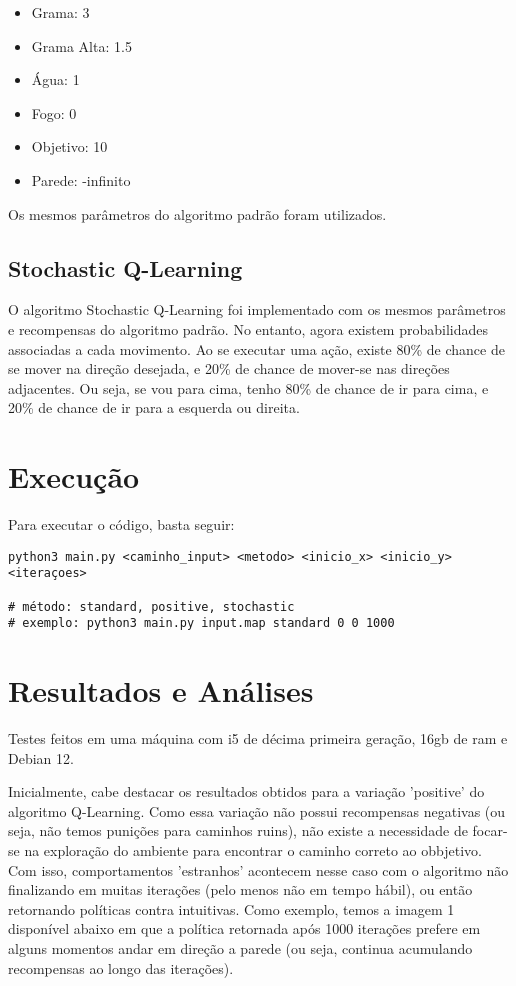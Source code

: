 \documentclass[10pt]{extarticle} %
\begin{document}
\begin{itemize}
    \item Grama: 3
    \item Grama Alta: 1.5
    \item Água: 1
    \item Fogo: 0
    \item Objetivo: 10
    \item Parede: -infinito
\end{itemize}

Os mesmos parâmetros do algoritmo padrão foram utilizados.

\subsection{Stochastic Q-Learning}

O algoritmo Stochastic Q-Learning foi implementado com os mesmos parâmetros e recompensas do algoritmo padrão. No entanto, agora existem probabilidades associadas a cada movimento. Ao se executar uma ação, existe 80\% de chance de se mover na direção desejada, e 20\% de chance de mover-se nas direções adjacentes. Ou seja, se vou para cima, tenho 80\% de chance de ir para cima, e 20\% de chance de ir para a esquerda ou direita.

\section{Execução}

Para executar o código, basta seguir:

\begin{verbatim}
python3 main.py <caminho_input> <metodo> <inicio_x> <inicio_y> <iteraçoes>

# método: standard, positive, stochastic
# exemplo: python3 main.py input.map standard 0 0 1000
\end{verbatim}

\section{Resultados e Análises}

Testes feitos em uma máquina com i5 de décima primeira geração, 16gb de ram e Debian 12.

Inicialmente, cabe destacar os resultados obtidos para a variação 'positive' do algoritmo Q-Learning. Como essa variação não possui recompensas negativas (ou seja, não temos punições para caminhos ruins), não existe a necessidade de focar-se na exploração do ambiente para encontrar o caminho correto ao obbjetivo. Com isso, comportamentos 'estranhos' acontecem nesse caso com o algoritmo não finalizando em muitas iterações (pelo menos não em tempo hábil), ou então retornando políticas contra intuitivas. Como exemplo, temos a imagem 1 disponível abaixo em que a política retornada após 1000 iterações prefere em alguns momentos andar em direção a parede (ou seja, continua acumulando recompensas ao longo das iterações).
\end{document}
